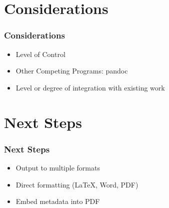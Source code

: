 \documentclass{beamer}
\begin{document}
\section{Considerations}
\begin{frame}
\frametitle{Considerations}
    \begin{itemize}
    \item Level of Control
    \item Other Competing Programs: pandoc
    \item Level or degree of integration with existing work
    \end{itemize}
\end{frame}

\section{Next Steps}
\begin{frame}
\frametitle{Next Steps}
    \begin{itemize}
    \item Output to multiple formats
    \item Direct formatting (LaTeX, Word, PDF)
    \item Embed metadata into PDF
    \end{itemize}
\end{frame}
\end{document}
